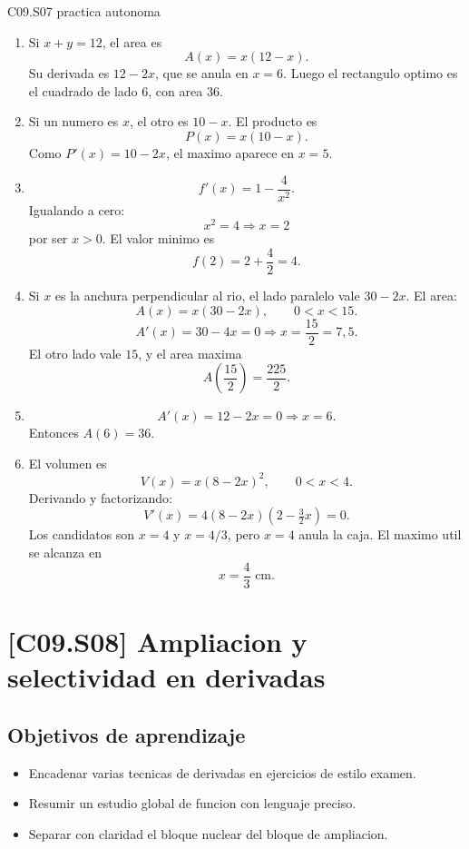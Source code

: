 \begin{fullsolution}{C09.S07 practica autonoma}
\begin{enumerate}[label=\textbf{PX-C09.S07-\arabic*:}, leftmargin=*]
  \item Si \(x+y=12\), el area es
  \[
  A(x)=x(12-x).
  \]
  Su derivada es \(12-2x\), que se anula en \(x=6\). Luego el rectangulo optimo es el
  cuadrado de lado \(6\), con area \(36\).
  \item Si un numero es \(x\), el otro es \(10-x\). El producto es
  \[
  P(x)=x(10-x).
  \]
  Como \(P'(x)=10-2x\), el maximo aparece en \(x=5\).
  \item
  \[
  f'(x)=1-\frac{4}{x^2}.
  \]
  Igualando a cero:
  \[
  x^2=4 \Longrightarrow x=2
  \]
  por ser \(x>0\). El valor minimo es
  \[
  f(2)=2+\frac{4}{2}=4.
  \]
  \item Si \(x\) es la anchura perpendicular al rio, el lado paralelo vale \(30-2x\). El area:
  \[
  A(x)=x(30-2x),\qquad 0<x<15.
  \]
  \[
  A'(x)=30-4x=0 \Longrightarrow x=\frac{15}{2}=7{,}5.
  \]
  El otro lado vale \(15\), y el area maxima
  \[
  A\left(\frac{15}{2}\right)=\frac{225}{2}.
  \]
  \item
  \[
  A'(x)=12-2x=0 \Longrightarrow x=6.
  \]
  Entonces \(A(6)=36\).
  \item El volumen es
  \[
  V(x)=x(8-2x)^2,\qquad 0<x<4.
  \]
  Derivando y factorizando:
  \[
  V'(x)=4(8-2x)(2- \tfrac{3}{2}x)=0.
  \]
  Los candidatos son \(x=4\) y \(x=4/3\), pero \(x=4\) anula la caja. El maximo util se
  alcanza en
  \[
  x=\frac{4}{3}\text{ cm}.
  \]
\end{enumerate}
\end{fullsolution}

\section{[C09.S08] Ampliacion y selectividad en derivadas}

\subsection*{Objetivos de aprendizaje}
\begin{itemize}
  \item Encadenar varias tecnicas de derivadas en ejercicios de estilo examen.
  \item Resumir un estudio global de funcion con lenguaje preciso.
  \item Separar con claridad el bloque nuclear del bloque de ampliacion.
\end{itemize}

